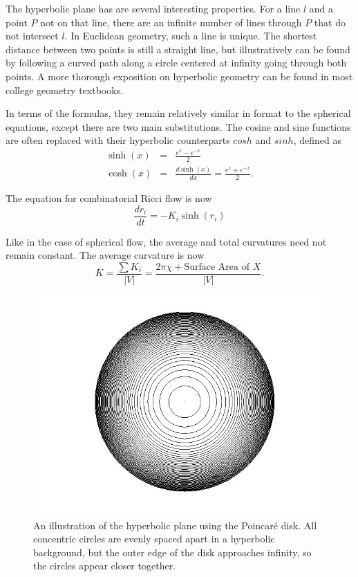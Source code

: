 \documentclass[12pt]{article}
\begin{document}
 The hyperbolic plane has are several interesting properties. For a line $l$ and a point $P$ not on that line, there are an infinite number of lines through $P$ that do not intersect $l$. In Euclidean geometry, such a line is unique. The shortest distance between two points is still a straight line, but illustratively can be found by following a curved path along a circle centered at infinity going through both points. A more thorough exposition on hyperbolic geometry can be found in most college geometry textbooks.

 In terms of the formulas, they remain relatively similar in format to the spherical equations, except there are two main substitutions. The cosine and sine functions are often replaced with their hyperbolic counterparts $cosh$ and $sinh$, defined as
\begin{eqnarray*}
\sinh(x) &=& \frac{e^x - e^{-x}}{2}\\
\cosh(x) &=& \frac{d\sinh(x)}{dx} = \frac{e^x + e^{-x}}{2}.
\end{eqnarray*}

 The equation for combinatorial Ricci flow is now
\begin{equation}
\label{HRiccif}
\frac{dr_i}{dt} = -K_i\sinh(r_i)
\end{equation}
 

 Like in the case of spherical flow, the average and total curvatures need not remain constant. The average curvature is now
$$\overline{K} = \frac{\sum{K_i}}{|V|} = \frac{2\pi\chi + \mbox{Surface Area of }X}{|V|}.$$

\begin{figure}
\centering
\includegraphics[scale = 0.5]{Pictures/pDisk.png}
\caption{An illustration of the hyperbolic plane using the Poincar\'{e} disk. All concentric circles are evenly spaced apart in a hyperbolic background, but the outer edge of the disk approaches infinity, so the circles appear closer together.}
\label{PD}
\end{figure}
\end{document}
